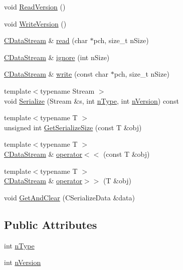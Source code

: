 \begin{DoxyCompactItemize}
\item 
void \hyperlink{class_c_data_stream_ad8f97bbd83ef3d2eebfd3f9c82f55260}{Read\+Version} ()
\item 
void \hyperlink{class_c_data_stream_a35d49028155fb47d2bb5c2dbaf31bc8e}{Write\+Version} ()
\item 
\hyperlink{class_c_data_stream}{C\+Data\+Stream} \& \hyperlink{class_c_data_stream_af3743932a68e3ee3f1dbd357993a51ae}{read} (char $\ast$pch, size\+\_\+t n\+Size)
\item 
\hyperlink{class_c_data_stream}{C\+Data\+Stream} \& \hyperlink{class_c_data_stream_aebfcaa009d328a208dbbcd13db846dd6}{ignore} (int n\+Size)
\item 
\hyperlink{class_c_data_stream}{C\+Data\+Stream} \& \hyperlink{class_c_data_stream_abcab3fa1be7676ffdb34908ec7c84b78}{write} (const char $\ast$pch, size\+\_\+t n\+Size)
\item 
{\footnotesize template$<$typename Stream $>$ }\\void \hyperlink{class_c_data_stream_a3ecece05df6fb20d5f7b93e59acb8ff3}{Serialize} (Stream \&s, int \hyperlink{class_c_data_stream_a2b646679e24cf6f382fe8ab2d4f50f35}{n\+Type}, int \hyperlink{class_c_data_stream_a074998c6b7c8aa17a1a90dbc414b605d}{n\+Version}) const 
\item 
{\footnotesize template$<$typename T $>$ }\\unsigned int \hyperlink{class_c_data_stream_aaf2b9e953793ce5a4fc438a7ecb00dc2}{Get\+Serialize\+Size} (const T \&obj)
\item 
{\footnotesize template$<$typename T $>$ }\\\hyperlink{class_c_data_stream}{C\+Data\+Stream} \& \hyperlink{class_c_data_stream_af47c6d4051064a226f529ee4d7c13ad7}{operator$<$$<$} (const T \&obj)
\item 
{\footnotesize template$<$typename T $>$ }\\\hyperlink{class_c_data_stream}{C\+Data\+Stream} \& \hyperlink{class_c_data_stream_ac80cfc65569416f8c23e328edb4cadae}{operator$>$$>$} (T \&obj)
\item 
void \hyperlink{class_c_data_stream_a4be60514b69c71a722e16bf1fbbc3c6c}{Get\+And\+Clear} (C\+Serialize\+Data \&data)
\end{DoxyCompactItemize}
\subsection*{Public Attributes}
\begin{DoxyCompactItemize}
\item 
int \hyperlink{class_c_data_stream_a2b646679e24cf6f382fe8ab2d4f50f35}{n\+Type}
\item 
int \hyperlink{class_c_data_stream_a074998c6b7c8aa17a1a90dbc414b605d}{n\+Version}
\end{DoxyCompactItemize}
